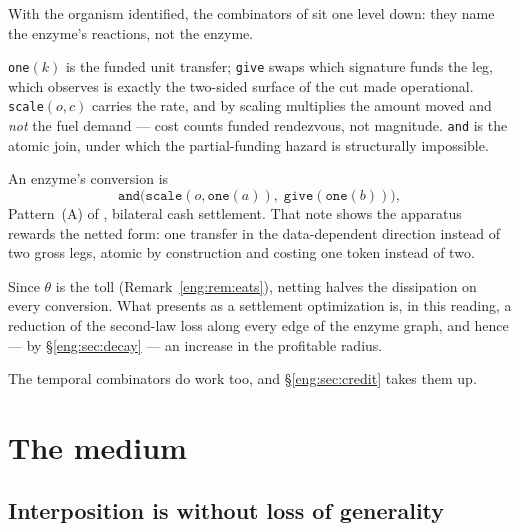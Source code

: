 With the organism identified, the combinators of \cite{SPJ2000} sit one
level down: they name the enzyme's reactions, not the enzyme.

\texttt{one}$(k)$ is the funded unit transfer; \texttt{give} swaps which
signature funds the leg, which \cite[\S3.1]{finrho} observes is exactly the
two-sided surface of the cut made operational. \texttt{scale}$(o,c)$
carries the rate, and by \cite[\S3.6]{finrho} scaling multiplies the amount
moved and \emph{not} the fuel demand --- cost counts funded rendezvous, not
magnitude. \texttt{and} is the atomic join, under which the partial-funding
hazard is structurally impossible.

\begin{observation}\label{eng:swap-netted-futures-shape}
An enzyme's conversion is
\[
  \texttt{and}\bigl(\texttt{scale}(o,\texttt{one}(a)),\;
                    \texttt{give}(\texttt{one}(b))\bigr),
\]
Pattern~(A) of \cite[Tab.~1]{finrho}, bilateral cash settlement. That
note shows the apparatus rewards the netted form: one transfer in the
data-dependent direction instead of two gross legs, atomic by construction
and costing one token instead of two.
\end{observation}

\begin{corollary}\label{eng:netting-thermodynamic}
Since $\theta$ is the toll (Remark~\ref{eng:rem:eats}), netting halves the
dissipation on every conversion. What \cite{finrho} presents as a
settlement optimization is, in this reading, a reduction of the second-law
loss along every edge of the enzyme graph, and hence --- by
\S\ref{eng:sec:decay} --- an increase in the profitable radius.
\end{corollary}

The temporal combinators do work too, and \S\ref{eng:sec:credit} takes them up.

\section{The medium}\label{eng:S5}
\label{eng:sec:medium}

\subsection{Interposition is without loss of generality}\label{eng:S5.1}

